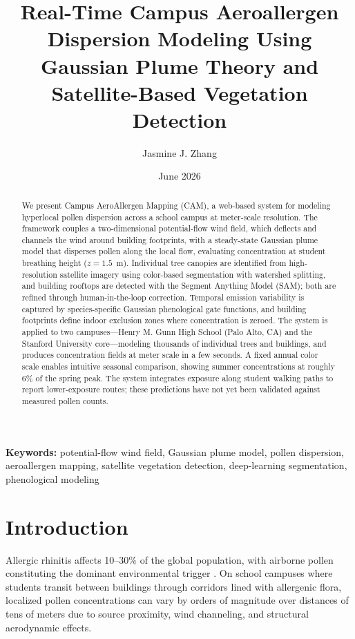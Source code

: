 \documentclass[11pt]{article}
\title{Real-Time Campus Aeroallergen Dispersion Modeling Using Gaussian Plume Theory and Satellite-Based Vegetation Detection}
\author[1]{Jasmine J. Zhang}
\affil[1]{Henry M. Gunn High School, Palo Alto, CA 94306, USA}
\date{June 2026}
\begin{document}
\maketitle

\begin{abstract}
We present Campus AeroAllergen Mapping (CAM), a web-based system for modeling hyperlocal pollen dispersion across a school campus at meter-scale resolution. The framework couples a two-dimensional potential-flow wind field, which deflects and channels the wind around building footprints, with a steady-state Gaussian plume model that disperses pollen along the local flow, evaluating concentration at student breathing height ($z = 1.5$~m). Individual tree canopies are identified from high-resolution satellite imagery using color-based segmentation with watershed splitting, and building rooftops are detected with the Segment Anything Model (SAM); both are refined through human-in-the-loop correction. Temporal emission variability is captured by species-specific Gaussian phenological gate functions, and building footprints define indoor exclusion zones where concentration is zeroed. The system is applied to two campuses---Henry M. Gunn High School (Palo Alto, CA) and the Stanford University core---modeling thousands of individual trees and buildings, and produces concentration fields at meter scale in a few seconds. A fixed annual color scale enables intuitive seasonal comparison, showing summer concentrations at roughly 6\% of the spring peak. The system integrates exposure along student walking paths to report lower-exposure routes; these predictions have not yet been validated against measured pollen counts.
\end{abstract}

\noindent\textbf{Keywords:} potential-flow wind field, Gaussian plume model, pollen dispersion, aeroallergen mapping, satellite vegetation detection, deep-learning segmentation, phenological modeling

\vspace{0.5cm}

\section{Introduction}

Allergic rhinitis affects 10--30\% of the global population, with airborne pollen constituting the dominant environmental trigger \citep{bousquet2008}. On school campuses where students transit between buildings through corridors lined with allergenic flora, localized pollen concentrations can vary by orders of magnitude over distances of tens of meters due to source proximity, wind channeling, and structural aerodynamic effects.
\end{document}
